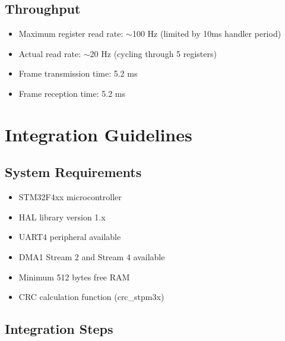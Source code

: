 \documentclass[11pt,a4paper]{article}
\begin{document}
\subsection{Throughput}

\begin{itemize}[noitemsep]
    \item Maximum register read rate: $\sim$100 Hz (limited by 10ms handler period)
    \item Actual read rate: $\sim$20 Hz (cycling through 5 registers)
    \item Frame transmission time: 5.2 ms
    \item Frame reception time: 5.2 ms
\end{itemize}

\section{Integration Guidelines}

\subsection{System Requirements}

\begin{itemize}[noitemsep]
    \item STM32F4xx microcontroller
    \item HAL library version 1.x
    \item UART4 peripheral available
    \item DMA1 Stream 2 and Stream 4 available
    \item Minimum 512 bytes free RAM
    \item CRC calculation function (crc\_stpm3x)
\end{itemize}

\subsection{Integration Steps}
\end{document}
